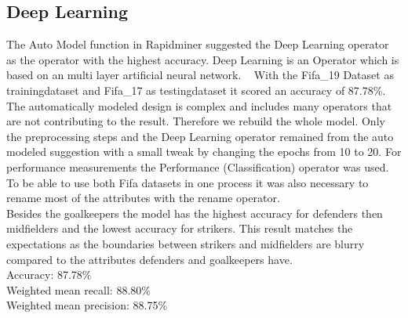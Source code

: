 \subsection{Deep Learning}

The Auto Model function in Rapidminer suggested the Deep Learning operator as the operator with the highest accuracy. Deep Learning is an Operator which is based on an multi layer artificial neural network. ~\cite{ref_rapidminerDeepLearning} With the Fifa_19 Dataset as trainingdataset and Fifa_17 as testingdataset it scored an accuracy of 87.78\%. The automatically modeled design is complex and includes many operators that are not contributing to the result. Therefore we rebuild the whole model. Only the preprocessing steps and the Deep Learning operator remained from the auto modeled suggestion with a small tweak by changing the epochs from 10 to 20. For performance measurements the Performance (Classification) operator was used. To be able to use both Fifa datasets in one process it was also necessary to rename most of the attributes with the rename operator. \\
Besides the goalkeepers the model has the highest accuracy for defenders then midfielders and the lowest accuracy for strikers. This result matches the expectations as the boundaries between strikers and midfielders are blurry compared to the attributes defenders and goalkeepers have. \\
Accuracy: 87.78\% \\
Weighted mean recall: 88.80\% \\
Weighted mean precision: 88.75\% \\

